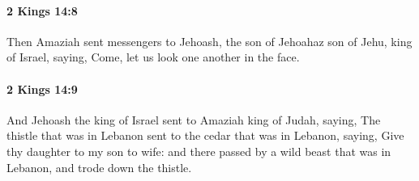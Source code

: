 		\paragraph{2 Kings 14:8} %
			\label{2KINGS-14-8}

			Then Amaziah sent messengers to Jehoash, the son of Jehoahaz son of Jehu, king of Israel, saying, Come, let us look one another in the face.


		\paragraph{2 Kings 14:9} %
			\label{2KINGS-14-9}

			And Jehoash the king of Israel sent to Amaziah king of Judah, saying, The thistle that was in Lebanon sent to the cedar that was in Lebanon, saying, Give thy daughter to my son to wife: and there passed by a wild beast that was in Lebanon, and trode down the thistle.

